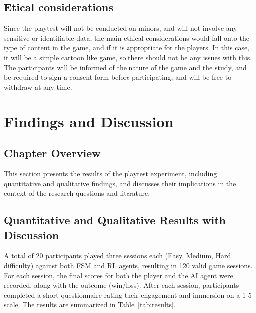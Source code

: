 \documentclass[conference]{IEEEtran}
\begin{document}
\subsection{Etical considerations}

Since the playtest will not be conducted on minors, and will not involve any sensitive or identifiable data, the main ethical considerations
would fall onto the type of content in the game, and if it is appropriate for the players. In this case, it will be a simple cartoon like game,
so there should not be any issues with this. The participants will be informed of the nature of the game and the study, and be required to
sign a consent form before participating, and will be free to withdraw at any time.

\section{Findings and Discussion}

\subsection{Chapter Overview}
This section presents the results of the playtest experiment, including quantitative and qualitative findings, and discusses their implications in the context of the research questions and literature.

\subsection{Quantitative and Qualitative Results with Discussion}

A total of 20 participants played three sessions each (Easy, Medium, Hard difficulty) against both FSM and RL agents, resulting in 120 valid game sessions.
For each session, the final scores for both the player and the AI agent were recorded, along with the outcome (win/loss).
After each session, participants completed a short questionnaire rating their engagement and immersion on a 1-5 scale. The results are summarized in Table~\ref{tab:results}.
\end{document}
